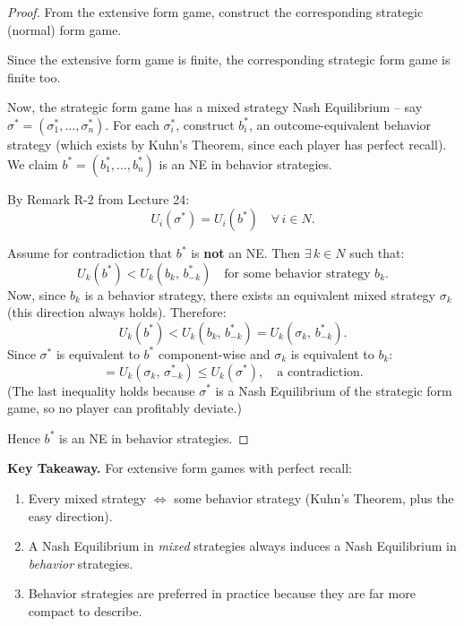 \documentclass[12pt, a4paper]{article}
\begin{document}
\begin{proof}
  From the extensive form game, construct the corresponding strategic (normal) form game.

  Since the extensive form game is finite, the corresponding strategic form game is finite too.

  Now, the strategic form game has a mixed strategy Nash Equilibrium -- say $\sigma^* = (\sigma_1^*,\ldots,\sigma_n^*)$. For each $\sigma_i^*$, construct $b_i^*$, an outcome-equivalent behavior strategy (which exists by Kuhn's Theorem, since each player has perfect recall). We claim $b^* = (b_1^*,\ldots,b_n^*)$ is an NE in behavior strategies.

  By Remark R-2 from Lecture 24:
  \[
    U_i(\sigma^*) = U_i(b^*) \quad \forall\, i \in N.
  \]

  Assume for contradiction that $b^*$ is \textbf{not} an NE. Then $\exists\, k \in N$ such that:
  \[
    U_k(b^*) < U_k(b_k,\, b^*_{-k})
    \quad \text{for some behavior strategy } b_k.
  \]
  Now, since $b_k$ is a behavior strategy, there exists an equivalent mixed strategy $\sigma_k$ (this direction always holds). Therefore:
  \[
    U_k(b^*) < U_k(b_k,\, b^*_{-k}) = U_k(\sigma_k,\, b^*_{-k}).
  \]
  Since $\sigma^*$ is equivalent to $b^*$ component-wise and $\sigma_k$ is equivalent to $b_k$:
  \[
    = U_k(\sigma_k,\, \sigma^*_{-k}) \leq U_k(\sigma^*), \quad \text{a contradiction.}
  \]
  (The last inequality holds because $\sigma^*$ is a Nash Equilibrium of the strategic form game, so no player can profitably deviate.)

  Hence $b^*$ is an NE in behavior strategies.
\end{proof}

\begin{takebox}
  \textbf{Key Takeaway.} For extensive form games with perfect recall:
  \begin{enumerate}
    \item Every mixed strategy $\Leftrightarrow$ some behavior strategy (Kuhn's Theorem, plus the easy direction).
    \item A Nash Equilibrium in \emph{mixed} strategies always induces a Nash Equilibrium in \emph{behavior} strategies.
    \item Behavior strategies are preferred in practice because they are far more compact to describe.
  \end{enumerate}
\end{takebox}
\end{document}
